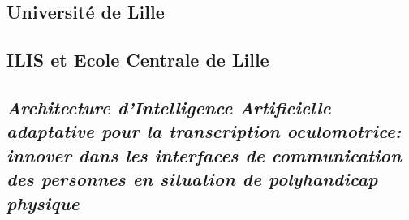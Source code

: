 \documentclass[
]{article}
\author{}
\date{}
\begin{document}
\hypertarget{universituxe9-de-lille}{%
\subsection{Université de Lille}\label{universituxe9-de-lille}}

\hypertarget{ilis-et-ecole-centrale-de-lille}{%
\subsection{ILIS et Ecole Centrale de Lille}\label{ilis-et-ecole-centrale-de-lille}}

\hypertarget{section}{%
\subsection{}\label{section}}

\hypertarget{section-1}{%
\subsection{}\label{section-1}}

\hypertarget{architecture-dintelligence-artificielle-adaptative-pour-la-transcription-oculomotrice-innover-dans-les-interfaces-de-communication-des-personnes-en-situation-de-polyhandicap-physique}{%
\subsection{\texorpdfstring{\emph{Architecture d'Intelligence Artificielle adaptative pour la transcription oculomotrice: innover dans les interfaces de communication des personnes en situation de polyhandicap physique}}{Architecture d'Intelligence Artificielle adaptative pour la transcription oculomotrice: innover dans les interfaces de communication des personnes en situation de polyhandicap physique}}\label{architecture-dintelligence-artificielle-adaptative-pour-la-transcription-oculomotrice-innover-dans-les-interfaces-de-communication-des-personnes-en-situation-de-polyhandicap-physique}}

\hypertarget{section-2}{%
\subsection{}\label{section-2}}

\hypertarget{section-3}{%
\subsection{}\label{section-3}}
\end{document}
